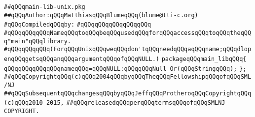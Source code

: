 \label{src/lib/c-glue-lib/ram/main-lib-unix.pkg}
\verb|##qQQqmain-lib-unix.pkg|\newline
\verb|##qQQqAuthor:qQQqMatthiasqQQqBlumeqQQq(blume@tti-c.org)|\newline
\newline
\verb|#qQQqCompiledqQQqby:|\newline
\verb|#qQQqqQQqqQQqqQQqqQQq|\newline
\newline
\verb|#qQQqqQQqqQQqNameqQQqtoqQQqbeqQQqusedqQQqforqQQqaccessqQQqtoqQQqtheqQQq"main"qQQqlibrary.|\newline
\verb|#qQQqqQQqqQQq(ForqQQqUnixqQQqweqQQqdon'tqQQqneedqQQqaqQQqname;qQQqdlopenqQQqgetsqQQqanqQQqargumentqQQqofqQQqNULL.)|\newline
\newline
\newline
\verb|packageqQQqmain_libqQQq{|\newline
\newline
\verb|qQQqqQQqqQQqqQQqnameqQQq=qQQqNULL:qQQqqQQqNull_Or(qQQqStringqQQq);|\newline
\verb|};|\newline
\newline
\newline
\newline
\verb|##qQQqCopyrightqQQq(c)qQQq2004qQQqbyqQQqTheqQQqFellowshipqQQqofqQQqSML/NJ|\newline
\verb|##qQQqSubsequentqQQqchangesqQQqbyqQQqJeffqQQqProtheroqQQqCopyrightqQQq(c)qQQq2010-2015,|\newline
\verb|##qQQqreleasedqQQqperqQQqtermsqQQqofqQQqSMLNJ-COPYRIGHT.|\newline


